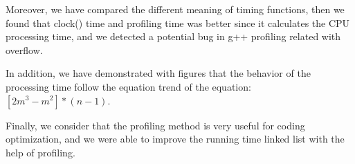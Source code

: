 \documentclass[12pt]{article}
\begin{document}
    Moreover, we have compared the different meaning of timing functions, then we found that clock() time and profiling time was better since it calculates the CPU processing time, and we detected a potential bug in g++ profiling related with overflow.
    
    In addition,  we have demonstrated with figures that the behavior of the processing time follow the equation trend of the equation: $[2m^3-m^2]*(n-1)$. 
    
    Finally, we consider that the profiling method is very useful for coding optimization, and we were able to improve the running time linked list with the help of profiling.
    
    
\end{document}
